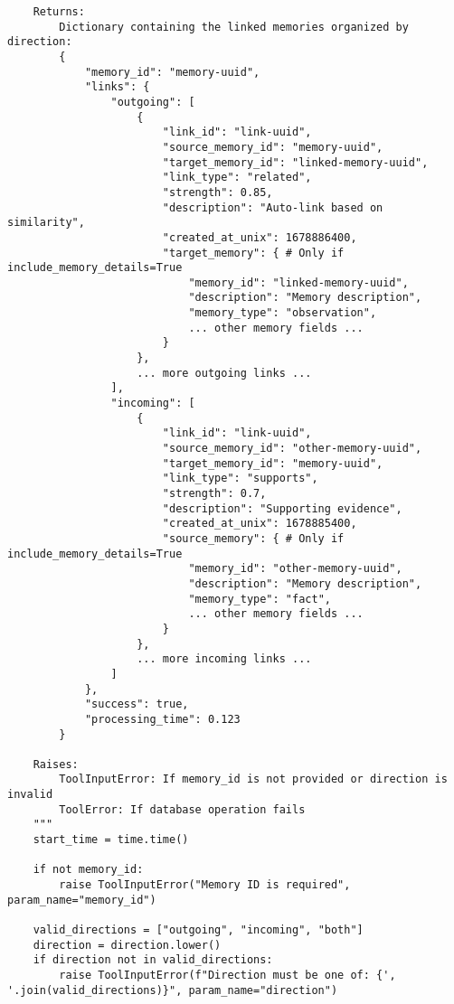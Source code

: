 \documentclass[12pt,a4paper]{article}
\begin{document}
\begin{pageablecode}
\begin{verbatim}
    Returns:
        Dictionary containing the linked memories organized by direction:
        {
            "memory_id": "memory-uuid",
            "links": {
                "outgoing": [
                    {
                        "link_id": "link-uuid",
                        "source_memory_id": "memory-uuid", 
                        "target_memory_id": "linked-memory-uuid",
                        "link_type": "related",
                        "strength": 0.85,
                        "description": "Auto-link based on similarity",
                        "created_at_unix": 1678886400,
                        "target_memory": { # Only if include_memory_details=True
                            "memory_id": "linked-memory-uuid",
                            "description": "Memory description",
                            "memory_type": "observation",
                            ... other memory fields ...
                        }
                    },
                    ... more outgoing links ...
                ],
                "incoming": [
                    {
                        "link_id": "link-uuid",
                        "source_memory_id": "other-memory-uuid",
                        "target_memory_id": "memory-uuid",
                        "link_type": "supports",
                        "strength": 0.7,
                        "description": "Supporting evidence",
                        "created_at_unix": 1678885400,
                        "source_memory": { # Only if include_memory_details=True
                            "memory_id": "other-memory-uuid",
                            "description": "Memory description",
                            "memory_type": "fact",
                            ... other memory fields ...
                        }
                    },
                    ... more incoming links ...
                ]
            },
            "success": true,
            "processing_time": 0.123
        }
        
    Raises:
        ToolInputError: If memory_id is not provided or direction is invalid
        ToolError: If database operation fails
    """
    start_time = time.time()
    
    if not memory_id:
        raise ToolInputError("Memory ID is required", param_name="memory_id")
    
    valid_directions = ["outgoing", "incoming", "both"]
    direction = direction.lower()
    if direction not in valid_directions:
        raise ToolInputError(f"Direction must be one of: {', '.join(valid_directions)}", param_name="direction")
    

\end{verbatim}
\end{pageablecode}
\end{document}
